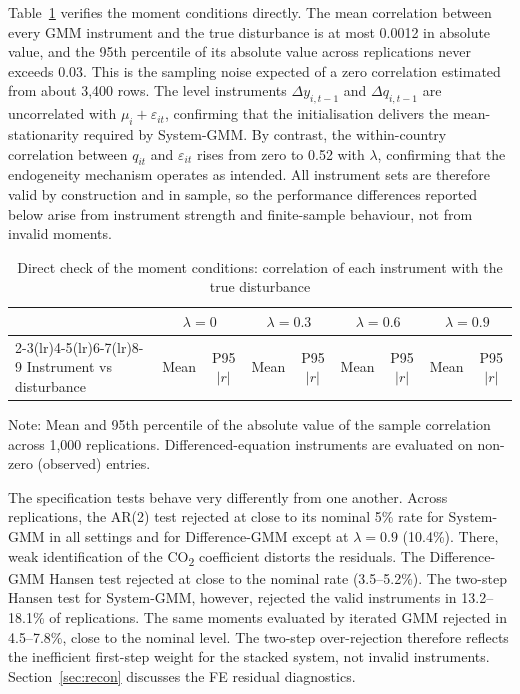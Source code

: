 \documentclass[11pt,a4paper]{article}
\newcommand{\COtwo}{CO\textsubscript{2}}
\begin{document}
Table~\ref{tab:oracle} verifies the moment conditions directly. The mean correlation between every GMM instrument and the true disturbance is at most 0.0012 in absolute value, and the 95th percentile of its absolute value across replications never exceeds 0.03. This is the sampling noise expected of a zero correlation estimated from about 3{,}400 rows. The level instruments $\Delta y_{i,t-1}$ and $\Delta q_{i,t-1}$ are uncorrelated with $\mu_i+\varepsilon_{it}$, confirming that the initialisation delivers the mean-stationarity required by System-GMM. By contrast, the within-country correlation between $q_{it}$ and $\varepsilon_{it}$ rises from zero to 0.52 with $\lambda$, confirming that the endogeneity mechanism operates as intended. All instrument sets are therefore valid by construction and in sample, so the performance differences reported below arise from instrument strength and finite-sample behaviour, not from invalid moments.

\begin{table}[htbp]
\centering
\begin{threeparttable}
\caption{Direct check of the moment conditions: correlation of each instrument with the true disturbance}\label{tab:oracle}
\scriptsize
\setlength{\tabcolsep}{3.5pt}
\begin{tabular}{@{}lcccccccc@{}}
\toprule
 & \multicolumn{2}{c}{$\lambda=0$} & \multicolumn{2}{c}{$\lambda=0.3$} & \multicolumn{2}{c}{$\lambda=0.6$} & \multicolumn{2}{c}{$\lambda=0.9$} \\
\cmidrule(lr){2-3}\cmidrule(lr){4-5}\cmidrule(lr){6-7}\cmidrule(lr){8-9}
Instrument vs disturbance & Mean & P95$|r|$ & Mean & P95$|r|$ & Mean & P95$|r|$ & Mean & P95$|r|$ \\
\midrule
\bottomrule
\end{tabular}
\begin{tablenotes}\footnotesize
\item Note: Mean and 95th percentile of the absolute value of the sample correlation across 1{,}000 replications. Differenced-equation instruments are evaluated on non-zero (observed) entries.
\end{tablenotes}
\end{threeparttable}
\end{table}

The specification tests behave very differently from one another. Across replications, the AR(2) test rejected at close to its nominal 5\% rate for System-GMM in all settings and for Difference-GMM except at $\lambda=0.9$ (10.4\%). There, weak identification of the \COtwo{} coefficient distorts the residuals. The Difference-GMM Hansen test rejected at close to the nominal rate (3.5--5.2\%). The two-step Hansen test for System-GMM, however, rejected the valid instruments in 13.2--18.1\% of replications. The same moments evaluated by iterated GMM rejected in 4.5--7.8\%, close to the nominal level. The two-step over-rejection therefore reflects the inefficient first-step weight for the stacked system, not invalid instruments. Section~\ref{sec:recon} discusses the FE residual diagnostics.
\end{document}
